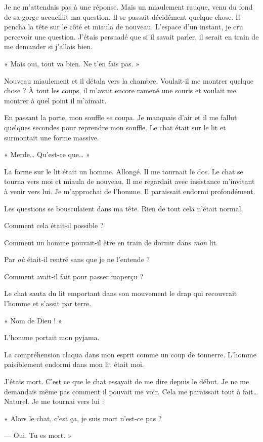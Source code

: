 Je ne m'attendais pas à une réponse. Mais un miaulement rauque, venu du fond de sa gorge accueillit ma question. 
Il se passait décidément quelque chose. Il pencha la tête sur le côté et miaula de nouveau. L'espace d'un instant, je 
cru percevoir une question. J'étais persuadé que si il savait parler, il serait en train de me demander si j'allais 
bien.

« Mais oui, tout va bien. Ne t'en fais pas. »

Nouveau miaulement et il détala vers la chambre. Voulait-il me montrer quelque chose ? À tout les coups, il m'avait 
encore ramené une souris et voulait me montrer à quel point il m'aimait.

En passant la porte, mon souffle se coupa. Je manquais d'air et il me fallut quelques secondes pour reprendre mon 
souffle. Le chat était sur le lit et surmontait une forme massive.

« Merde… Qu'est-ce que… »

La forme sur le lit était un homme. Allongé. Il me tournait le dos. Le chat se tourna vers moi et miaula de nouveau. Il 
me regardait avec insistance m'invitant à venir vers lui. Je m'approchai de l'homme. Il paraissait endormi 
profondément. 

Les questions se bousculaient dans ma tête. Rien de tout cela n'était normal.

Comment cela était-il possible ?

Comment un homme pouvait-il être en train de dormir dans \emph{mon} lit.

Par \emph{où} était-il rentré sans que je ne l'entende ?

Comment avait-il fait pour passer inaperçu ? 

Le chat sauta du lit emportant dans son mouvement le drap qui recouvrait l'homme et s'assit par terre.

« Nom de Dieu ! »

L'homme portait mon pyjama.

La compréhension claqua dans mon esprit comme un coup de tonnerre. L'homme paisiblement endormi dans mon lit était moi. 

J'étais mort. C'est ce que le chat essayait de me dire depuis le début. Je ne me demandais même pas comment il pouvait 
me voir. Cela me paraissait tout à fait… Naturel. Je me tournai vers lui :

« Alors le chat, c'est ça, je suis mort n'est-ce pas ?

— Oui. Tu es mort. »

